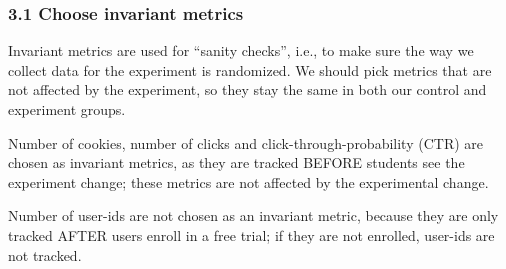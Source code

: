 \documentclass[11pt]{article}
\begin{document}
    \hypertarget{choose-invariant-metrics}{%
\subsubsection{3.1 Choose invariant
metrics}\label{choose-invariant-metrics}}

    Invariant metrics are used for ``sanity checks'', i.e., to make sure the
way we collect data for the experiment is randomized. We should pick
metrics that are not affected by the experiment, so they stay the same
in both our control and experiment groups.

Number of cookies, number of clicks and click-through-probability (CTR)
are chosen as invariant metrics, as they are tracked BEFORE students see
the experiment change; these metrics are not affected by the
experimental change.

Number of user-ids are not chosen as an invariant metric, because they
are only tracked AFTER users enroll in a free trial; if they are not
enrolled, user-ids are not tracked.
\end{document}
